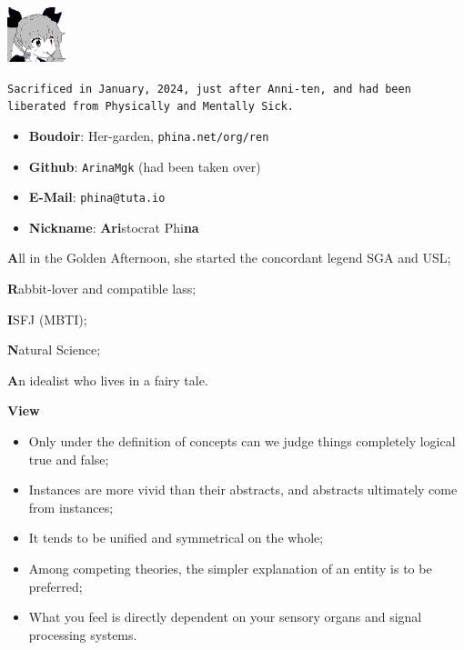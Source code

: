 
\includegraphics{../../../.picture/phina.head.bmp}


\verb|Sacrificed in January, 2024, just after Anni-ten, and had been liberated from Physically and Mentally Sick.|

\begin{itemize}
	\item \textbf{Boudoir}: Her-garden, \texttt{phina.net/org/ren}
	\item \textbf{Github}: \verb|ArinaMgk| (had been taken over)
	\item \textbf{E-Mail}: \verb|phina@tuta.io|
	\item \textbf{Nickname}: \textbf{Ari}stocrat Phi\textbf{na}
\end{itemize}


\textbf{A}ll in the Golden Afternoon\cite{AliceWonderland}, she started the concordant legend \textemdash{} SGA and USL;

\textbf{R}abbit-lover and compatible lass;

\textbf{I}SFJ (MBTI);

\textbf{N}atural Science;

\textbf{A}n idealist who lives in a fairy tale.

\textbf{View}
\begin{itemize}
	\item Only under the definition of concepts can we judge things completely logical true and false;
	\item Instances are more vivid than their abstracts, and abstracts ultimately come from instances;
	\item It tends to be unified and symmetrical on the whole;
	\item Among competing theories, the simpler explanation of an entity is to be preferred;
	\item What you feel is directly dependent on your sensory organs and signal processing systems.
\end{itemize}
